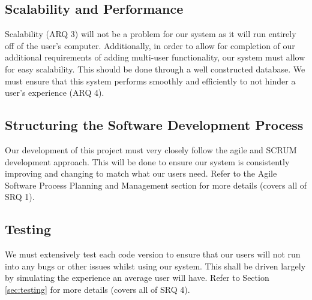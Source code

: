 \documentclass[12pt]{article}
\begin{document}
\subsection{Scalability and Performance}

Scalability (ARQ 3) will not be a problem for our system as it will run entirely
off of the user's computer. Additionally, in order to allow for completion of our
additional requirements of adding multi-user functionality, our system must
allow for easy scalability. This should be done through a well constructed
database. We must ensure that this system performs smoothly and efficiently to not
hinder a user's experience (ARQ 4).


\subsection{Structuring the Software Development Process}

Our development of this project must very closely follow the agile and SCRUM
development approach. This will be done to ensure our system is consistently
improving and changing to match what our users need. Refer to the Agile Software
Process Planning and Management section for more details (covers all of SRQ 1).

\subsection{Testing}

We must extensively test each code version to ensure that our users will not run
into any bugs or other issues whilst using our system. This shall be driven
largely by simulating the experience an average user will have. Refer to
Section \ref{sec:testing} for more details (covers all of SRQ 4).
\end{document}
